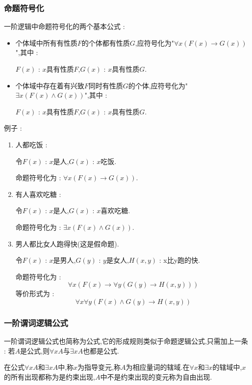 \documentclass[UTF8,12pt]{ctexbook}
\begin{document}
{{{{  \subsubsection{命题符号化}{
    一阶逻辑中命题符号化的两个基本公式 :

    \begin{itemize}
      \item {
            个体域中所有有性质$F$的个体都有性质$G$,应符号化为"$\forall x (F(x) \to G(x))$",其中 :

            $F(x)$ : $x$具有性质$F$,$G(x)$ : $x$具有性质$G$.
            }
      \item {
            个体域中存在着有兴致$F$同时有性质$G$的个体,应符号化为"$\exists x (F(x) \land G(x))$",其中 :

            $F(x)$ : $x$具有性质$F$,$G(x)$ : $x$具有性质$G$.
            }
    \end{itemize}

    例子 :
    \begin{enumerate}
      \item {
            人都吃饭 :

            令$F(x)$ : $x$是人,$G(x)$ : $x$吃饭.

            命题符号化为 : $\forall x (F(x) \to G(x))$.
            }
      \item {
            有人喜欢吃糖 :

            令$F(x)$ : $x$是人,$G(x)$ : $x$喜欢吃糖.

            命题符号化为 : $\exists x (F(x) \land G(x))$.
            }
      \item {
            男人都比女人跑得快(这是假命题).

            令$F(x)$ : $x$是男人,$G(y)$ : $y$是女人,$H(x,y)$ : x比y跑的快.

            命题符号化为 : $$
              \forall x (F(x) \to \forall y (G(y) \to H(x,y)))
            $$
            等价形式为 : $$
              \forall x \forall y (F(x) \land G(y) \to H(x,y))
            $$
            }
    \end{enumerate}
  }%

  \subsubsection{一阶谓词逻辑公式}{
    一阶谓词逻辑公式也简称为公式,它的形成规则类似于命题逻辑公式,只需加上一条 : 若$A$是公式,则$\forall x A$与$\exists x A$也都是公式.

    在公式$\forall x A$和$\exists x A$中,称$x$为指导变元,称$A$为相应量词的辖域.在$\forall x$和$\exists x$的辖域中,$x$的所有出现都称为是约束出现,$A$中不是约束出现的变元称为自由出现.

}}}}}
\end{document}
